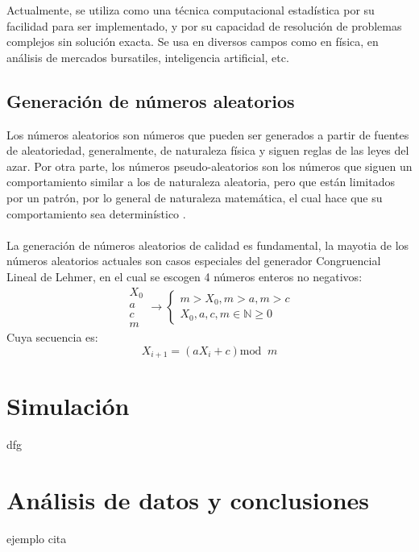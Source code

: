 \documentclass[12pt,a4paper]{article}
\begin{document}
Actualmente, se utiliza como una técnica computacional estadística por su facilidad para ser implementado, y por su capacidad de resolución de problemas complejos sin solución exacta. Se usa en diversos campos como en física, en análisis de mercados bursatiles, inteligencia artificial, etc. 
 
\subsection{Generación de números aleatorios}

Los números aleatorios son números que pueden ser generados a partir de fuentes de aleatoriedad, generalmente, de naturaleza física y siguen reglas de las leyes del azar. Por otra parte, los números pseudo-aleatorios son los números que siguen un comportamiento similar a los de naturaleza aleatoria, pero que están limitados por un patrón, por lo general de naturaleza matemática, el cual hace que su comportamiento sea determinístico \cite{herrera2000numeros}. \\ \\

La generación de números aleatorios de calidad es fundamental, la mayotia de los números aleatorios actuales son casos especiales del generador Congruencial Lineal de Lehmer, en el cual se escogen 4 números enteros no negativos:
\begin{equation*}
\begin{matrix}
X_{0} \\
a \\
c\\
m
\end{matrix}
\to
\left\{\begin{matrix}
m > X_{0} ,m> a, m> c \\
X_{0},a,c,m \in \mathbb{N} \geq 0
\end{matrix}\right.
\end{equation*}
Cuya secuencia es: 
\begin{equation}
X_{i+1} = \left ( a X_{i} +c \right ) \textrm{mod} \;\; m
\end{equation}



\newpage

\section{Simulación}
dfg

\newpage
\section{Análisis de datos y conclusiones}
















ejemplo cita \cite{zapata2004metodo}


\newpage





\end{document}
